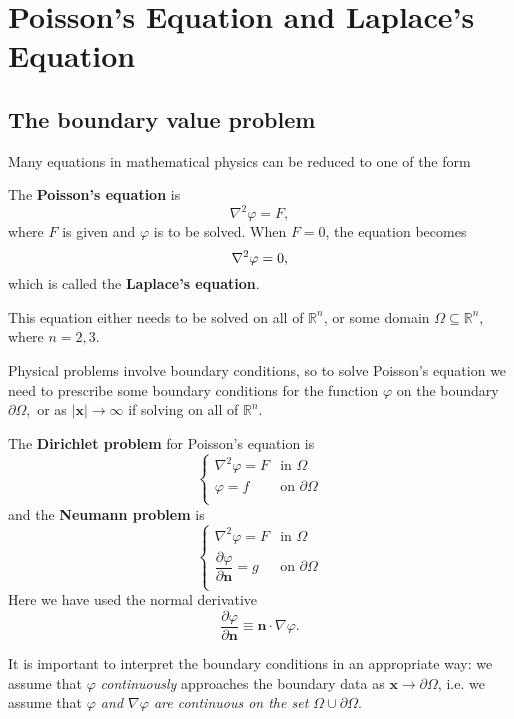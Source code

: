 \section{Poisson's Equation and Laplace's Equation}
\subsection{The boundary value problem}
Many equations in mathematical physics can be
reduced to one of the form
\begin{definition}
    The \textbf{Poisson's equation} is
    \[
      \nabla^2 \varphi = F,
    \]
    where $F$ is given and $\varphi$ is to be solved. When $ F=0 $, the equation becomes 
    \[
        \laplacian \varphi = 0,
    \]
    which is called the \textbf{Laplace's equation}.
\end{definition}

This equation either needs to be solved on all of $ \mathbb{R}^{n} $, or some domain $ \Omega \subseteq \mathbb{R}^{n} $, where $n=2,3$.

Physical problems involve boundary conditions, so to solve Poisson's equation we need to prescribe some boundary conditions for the function $\varphi$ on the boundary $\partial \Omega,$ or as $|\mathbf{x}| \rightarrow \infty$ if solving on all of $\mathbb{R}^{n}$. 

The \textbf{Dirichlet problem} for Poisson's equation is
\[
    \begin{cases}
        \nabla^{2} \varphi =F&\text {in } \Omega \\
        \varphi =f&\text {on } \partial \Omega\\
    \end{cases} 
\]
and the \textbf{Neumann problem} is
\[
    \begin{cases}
        \nabla^{2} \varphi =F  &\text {in } \Omega \\
        \dfrac{\partial \varphi}{\partial \mathbf{n}}=g & \text {on } \partial \Omega\\
    \end{cases} 
\]
Here we have used the normal derivative
\[
    \frac{\partial \varphi}{\partial \mathbf{n}} \equiv \mathbf{n} \cdot \nabla \varphi.
\]

It is important to interpret the boundary conditions in an appropriate way: we assume that $ \varphi $ \textit{continuously} approaches the boundary data as $\mathbf{x}\to\partial \Omega$, i.e. we assume that \textit{$\varphi$ and $\nabla \varphi$ are continuous on the set $\Omega \cup \partial \Omega$}.

